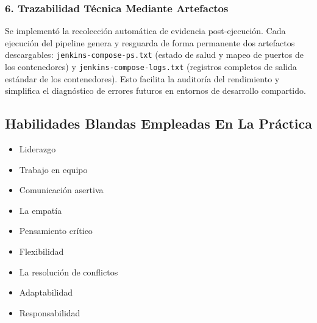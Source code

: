 \documentclass{article}
\newcommand{\checkedbox}{\stackinset{c}{0pt}{c}{0pt}{\checkmark}{$\square$}}
\begin{document}
\subsubsection*{6. Trazabilidad Técnica Mediante Artefactos}
Se implementó la recolección automática de evidencia post-ejecución. Cada ejecución del pipeline genera y resguarda de forma permanente dos artefactos descargables: \texttt{jenkins-compose-ps.txt} (estado de salud y mapeo de puertos de los contenedores) y \texttt{jenkins-compose-logs.txt} (registros completos de salida estándar de los contenedores). Esto facilita la auditoría del rendimiento y simplifica el diagnóstico de errores futuros en entornos de desarrollo compartido.

\subsection{Habilidades Blandas Empleadas En La Práctica}

\begin{itemize}
    \item[$\square$]  Liderazgo
    \item[\checkedbox] Trabajo en equipo
    \item[$\square$] Comunicación asertiva
    \item[$\square$] La empatía
    \item[\checkedbox] Pensamiento crítico
    \item[$\square$] Flexibilidad
    \item[$\square$] La resolución de conflictos
    \item[$\square$] Adaptabilidad
    \item[\checkedbox] Responsabilidad
\end{itemize}
\end{document}
